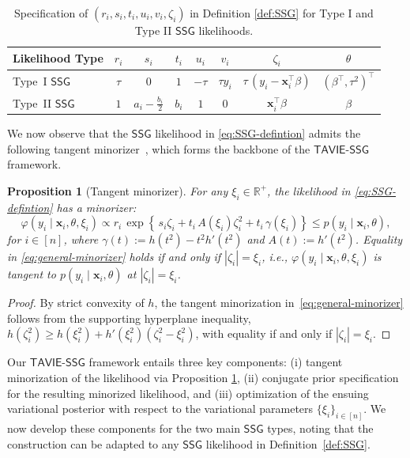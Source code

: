 \documentclass[12pt]{article}
\newtheorem{proposition}{Proposition}
\numberwithin{equation}{section}
\newcommand{\ssg}{\mathsf{SSG}}
\newcommand{\tssg}{\mathsf{TAVIE}\text{-}\mathsf{SSG}}
\begin{document}
{
\renewcommand{\baselinestretch}{1.0}\normalsize
\begin{table}[H]
\centering
\caption{\small Specification of $(r_i, s_i, t_i, u_i, v_i, \zeta_i)$ in Definition \ref{def:SSG} for Type I and Type II $\ssg$ likelihoods.}
\label{tab:ssg-types}
\begin{tabular}{lccccccc}
\toprule
\toprule
Likelihood Type & $r_i$ & $s_i$ & $t_i$ & $u_i$ & $v_i$ & $\zeta_i$ & $\theta$\\
\midrule
Type~I $\ssg$ & $\tau$ &
$0$ &
$1$ &
$-\tau$ &
$\tau y_i$ &
$\tau\,(y_i - \mathbf{x}_i^{\top}\beta)$ &
$(\beta^{\top}, \tau^2)^{\top}$\\
Type~II $\ssg$ & $1$ &
$a_i - \tfrac{b_i}{2}$ &
$b_i$ &
$1$ &
$0$ &
$\mathbf{x}_i^{\top}\beta$ &
$\beta$\\
\midrule
\bottomrule
\end{tabular}
\end{table}
}
%
We now observe that the $\ssg$ likelihood  in \eqref{eq:SSG-defintion} admits the following {tangent minorizer}~\citep{palmer-2005-paper}, which forms the backbone of the $\tssg$ framework. 
%
\begin{proposition}[Tangent minorizer]\label{prop:tangent-lower-bound}
For {any} $\xi_i \in \mathbb{R}^{+}$, the likelihood in \eqref{eq:SSG-defintion} has a minorizer:
\begin{equation}\label{eq:general-minorizer}
\varphi(y_i \mid \mathbf{x}_i, \theta, \xi_i) \propto r_i \, \exp \left\{\,s_i \zeta_i + t_i\,A(\xi_i)\zeta_i^2 + t_i\,\gamma(\xi_i)\right\} \leq p(y_i \mid \mathbf{x}_i, \theta),
\end{equation}
for $i\in [n]$, where $\gamma(t) := h(t^2) - t^2h'(t^2)$ and $A(t) := h'(t^2)$. Equality in \eqref{eq:general-minorizer} holds if and only if $|\zeta_i| = \xi_i$, i.e., $\varphi(y_i \mid \mathbf{x}_i, \theta, \xi_i)$ is tangent to $p(y_i \mid \mathbf{x}_i, \theta)$ at $|\zeta_i| = \xi_i$.
\end{proposition}
%
\begin{proof}
By strict convexity of $h$, the tangent minorization in~\eqref{eq:general-minorizer} follows from the supporting hyperplane inequality, $h(\zeta_i^2)\ge h(\xi_i^2)+h'(\xi_i^2)(\zeta_i^2-\xi_i^2)$, with equality if and only if $|\zeta_i|=\xi_i$.
\end{proof}
%
Our $\tssg$ framework entails three key components: (i) {tangent minorization} of the likelihood via Proposition \ref{prop:tangent-lower-bound}, (ii) conjugate prior specification for the resulting minorized likelihood, and (iii) {optimization} of the ensuing variational posterior with respect to the variational parameters {$\{\xi_i\}_{i \in [n]}$}. We now develop these components for the two main $\ssg$ types, noting that the construction can be adapted to any $\ssg$ likelihood in Definition~\ref{def:SSG}.
\end{document}
